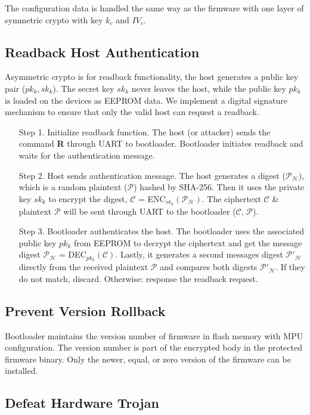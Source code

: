 \documentclass[11pt,oneside,onecolumn,letterpaper]{article}
\begin{document}
The configuration data is handled the same way as the firmware with one layer of symmetric crypto with key $k_c$ and $IV_c$.

\subsection{Readback Host Authentication}
Asymmetric crypto is for readback functionality, the host generates a public key pair ($pk_k, sk_k$).
The secret key $sk_k$ never leaves the host, while the public key $pk_k$ is loaded on the devices as EEPROM data.
We implement a digital signature mechanism to ensure that only the valid host can request a readback.
\begin{itemize}
  \item[Step 1.] Initialize readback function. 
  The host (or attacker) sends the command \textbf{R} through UART to bootloader.
  Bootloader initiates readback and waits for the authentication message.  
  \item[Step 2.] Host sends authentication message.
  The host generates a digest ($\mathcal{P_H}$), which is a random plaintext ($\mathcal{P}$) hashed by SHA-256.
  Then it uses the private key $sk_k$ to encrypt the digest, $\mathcal{C}$ = ENC$_{sk_k}(\mathcal{P_H})$.
  The ciphertext $\mathcal{C}$ \& plaintext $\mathcal{P}$ will be sent through UART to the bootloader ($\mathcal{C}$, $\mathcal{P}$).
  \item[Step 3.] Bootloader authenticates the host.
  The bootloader uses the associated public key $pk_k$ from EEPROM to decrypt the ciphertext and get the message digest $\mathcal{P_H}$ = DEC$_{pk_k}(\mathcal{C})$.
  Lastly, it generates a second messages digest $\mathcal{P'_H}$ directly from the received plaintext $\mathcal{P}$ and compares both digests $\mathcal{P'_H}$.
  If they do not match, discard.
  Otherwise: response the readback request.
\end{itemize}

\subsection{Prevent Version Rollback}
Bootloader maintains the version number of firmware in flash memory with MPU configuration.
The version number is part of the encrypted body in the protected firmware binary.
Only the newer, equal, or zero version of the firmware can be installed.
\subsection{Defeat Hardware Trojan}
\end{document}
